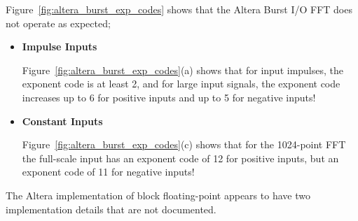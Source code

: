 \clearpage
Figure~\ref{fig:altera_burst_exp_codes} shows that the
Altera Burst I/O FFT does not operate as expected;
%
\begin{itemize}
\item \textbf{Impulse Inputs}

Figure~\ref{fig:altera_burst_exp_codes}(a) shows that for input impulses,
the exponent code is at least 2, and for large input signals, the
exponent code increases up to 6 for positive inputs and up to 5 for
negative inputs!

\item \textbf{Constant Inputs}

Figure~\ref{fig:altera_burst_exp_codes}(c) shows that for the 1024-point
FFT the full-scale input has an exponent code of 12 for positive inputs,
but an exponent code of 11 for negative inputs!

\end{itemize}
%
The Altera implementation of block floating-point appears to have two
implementation details that are not documented.
%
